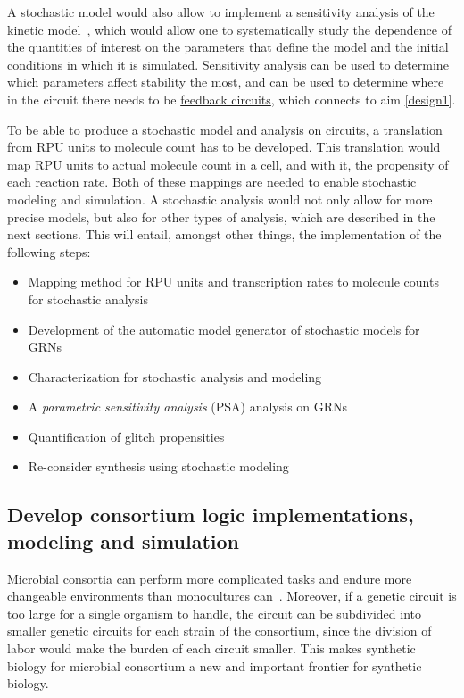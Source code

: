 \documentclass[12pt]{article}
\begin{document}
A stochastic model would also allow to implement a sensitivity analysis of the kinetic model~\cite{dacol_SensitivityAnalysisStochastic_1984,damiani_ParameterSensitivityAnalysis_2013,gupta_EfficientUnbiasedMethod_2014,irving_StochasticSensitivityAnalysis_1992,marino_MethodologyPerformingGlobal_2008}, which would allow one to systematically study the dependence of the quantities of interest on the parameters that define the model and the initial conditions in which it is simulated. Sensitivity analysis can be used to determine which parameters affect stability the most, and can be used to determine where in the circuit there needs to be \hyperlink{feedback}{feedback circuits}, which connects to aim \ref{design1}.

To be able to produce a stochastic model and analysis on circuits, a translation from RPU units to molecule count has to be developed. This translation would map RPU units to actual molecule count in a cell, and with it, the propensity of each reaction rate. Both of these mappings are needed to enable stochastic modeling and simulation. A stochastic analysis would not only allow for more precise models, but also for other types of analysis, which are described in the next sections. This will entail, amongst other things, the implementation of the following steps:

\begin{itemize}
	\item Mapping method for RPU units and transcription rates to molecule counts for stochastic analysis
	\item Development of the automatic model generator of stochastic models for GRNs
	\item Characterization for stochastic analysis and modeling
	\item  A \emph{parametric sensitivity analysis} (PSA) analysis on GRNs
	\item Quantification of glitch propensities
	\item Re-consider synthesis using stochastic modeling
\end{itemize}

\subsection{Develop consortium logic implementations, modeling and simulation} \label{consortium}
Microbial consortia can perform more complicated tasks and endure more changeable environments than monocultures can~\cite{brenner_EngineeringMicrobialConsortia_2008}. Moreover, if a genetic circuit is too large for a single organism to handle, the circuit can be subdivided into smaller genetic circuits for each strain of the consortium, since the division of labor would make the burden of each circuit smaller. This makes synthetic biology for microbial consortium a new and important frontier for synthetic biology.
\end{document}
